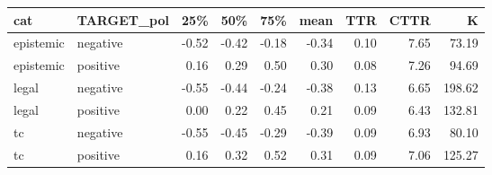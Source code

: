 \begin{table}[ht]
\centering
\begin{tabular}{llrrrrrrr}
  \hline
cat & TARGET\_pol & 25\% & 50\% & 75\% & mean & TTR & CTTR & K \\ 
  \hline
epistemic & negative & -0.52 & -0.42 & -0.18 & -0.34 & 0.10 & 7.65 & 73.19 \\ 
  epistemic & positive & 0.16 & 0.29 & 0.50 & 0.30 & 0.08 & 7.26 & 94.69 \\ 
  legal & negative & -0.55 & -0.44 & -0.24 & -0.38 & 0.13 & 6.65 & 198.62 \\ 
  legal & positive & 0.00 & 0.22 & 0.45 & 0.21 & 0.09 & 6.43 & 132.81 \\ 
  tc & negative & -0.55 & -0.45 & -0.29 & -0.39 & 0.09 & 6.93 & 80.10 \\ 
  tc & positive & 0.16 & 0.32 & 0.52 & 0.31 & 0.09 & 7.06 & 125.27 \\ 
   \hline
\end{tabular}
\end{table}
